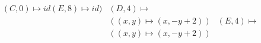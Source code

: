 \documentclass[preview]{standalone}
\begin{document}
\begin{align*}
(C,0) \mapsto id (E,8) \mapsto id) &(D,4) \mapsto \\&( (x,y) \mapsto (x, -y + 2)) &(E,4) \mapsto \\&( (x,y) \mapsto (x, -y + 2))
\end{align*}
\end{document}
